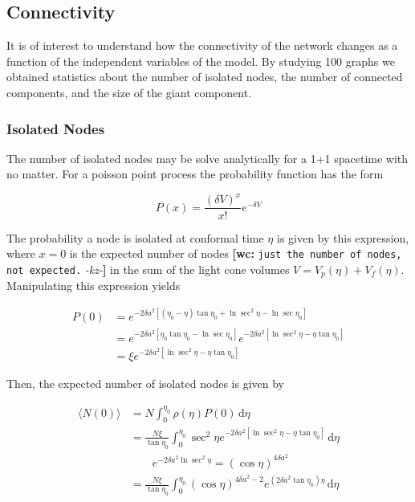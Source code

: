 \documentclass[preprint,notitlepage,amsmath,amssymb,floatfix]{revtex4-1}
\newcommand{\XXX}[3]{{\bf [#1: } {\tt #3} {\it -#2-}{\bf ]}}
\begin{document}
\subsection{Connectivity}
It is of interest to understand how the connectivity of the network changes as a function of the independent variables of the model.
By studying 100 graphs we obtained statistics about the number of isolated nodes, the number of connected components, and the size of the giant component.
\subsubsection{Isolated Nodes}
The number of isolated nodes may be solve analytically for a 1+1 spacetime with no matter.  For a poisson point process the probability function has the form

\begin{equation}
P(x) = \frac{\left(\delta V\right)^x}{x!}e^{-\delta V}
\end{equation}

\noindent The probability a node is isolated at conformal time $\eta$ is given by this expression, where $x=0$ is the expected number of nodes \XXX{wc}{kz}{just the number of nodes, not expected.} in the sum of the light cone volumes $V=V_p\left(\eta\right)+V_f\left(\eta\right)$.  
Manipulating this expression yields

\begin{equation}
\begin{split}
P\left(0\right) &= e^{-2\delta a^2\left[\left(\eta_0-\eta\right)\tan\eta_0 + \ln\sec^2\eta - \ln\sec\eta_0\right]} \\
  &= e^{-2\delta a^2\left[\eta_0\tan\eta_0 - \ln\sec\eta_0\right]}e^{-2\delta a^2\left[\ln\sec^2\eta - \eta\tan\eta_0\right]} \\
  &=\xi e^{-2\delta a^2\left[\ln\sec^2\eta-\eta\tan\eta_0\right]}
\end{split}
\end{equation}

\noindent Then, the expected number of isolated nodes is given by

\begin{equation}
\begin{split}
\langle N\left(0\right)\rangle &= N\int_0^{\eta_0}\!\rho\left(\eta\right)P\left(0\right)\,\mathrm d\eta \\
  &= \frac{N\xi}{\tan\eta_0}\int_0^{\eta_0}\!\sec^2\eta e^{-2\delta a^2\left[\ln\sec^2\eta - \eta\tan\eta_0\right]}\,\mathrm d\eta \\
  &\qquad e^{-2\delta a^2\ln\sec^2\eta} = \left(\cos\eta\right)^{4\delta a^2} \\
  &= \frac{N\xi}{\tan\eta_0}\int_0^{\eta_0}\left(\cos\eta\right)^{4\delta a^2 - 2} e^{\left(2\delta a^2 \tan\eta_0\right)\eta}\,\mathrm d\eta
\end{split}
\end{equation}
\end{document}
